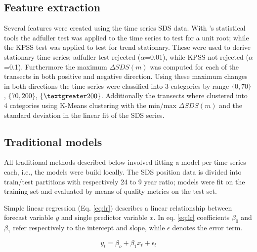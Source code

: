 \documentclass[format=sigconf, review=false, screen=true]{acmart}
\begin{document}

\subsection{Feature extraction}

Several features were created using the time series SDS data. With \citet{seabold2010statsmodels}'s statistical tools the adfuller test was applied to the time series to test for a unit root; while the KPSS test was applied to test for trend stationary. These were used to derive stationary time series; adfuller test rejected ($\alpha$=0.01), while KPSS not rejected ($\alpha$=0.1). Furthermore the maximum $\Delta SDS (m) $ was computed for each of the transects in both positive and negative direction. Using these maximum changes in both directions the time series were classified into 3 categories by range $\{0, 70\}$, $\{70, 200\}$, $\{\textgreater 200\}$. Additionally the transects where clustered into 4 categories using K-Means clustering \cite{seabold2010statsmodels} with the min/max $\Delta SDS (m) $ and the standard deviation in the linear fit of the SDS series. 

\subsection{Traditional models}

All traditional methods described below involved fitting a model per time series each, i.e., the models were build locally. The SDS position data is divided into train/test partitions with respectively 24 to 9 year ratio; models were fit on the training set and evaluated by means of quality metrics on the test set. 

Simple linear regression (Eq. \ref{eq:lr}) describes a linear relationship between forecast variable $y$ and single predictor variable $x$. In eq. \ref{eq:lr} coefficients $\beta_0$ and $\beta_1$ refer respectively to the intercept and slope, while $\epsilon$ denotes the error term.  

\begin{equation}
\label{eq:lr}
y_t = \beta_o + \beta_1x_t + \epsilon_t
\end{equation}
\end{document}
